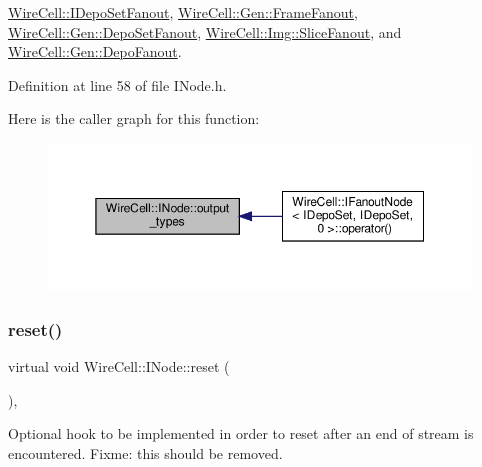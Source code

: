 \hyperlink{class_wire_cell_1_1_i_depo_set_fanout_a90833e933801d4152272189dc6ba1e38}{Wire\+Cell\+::\+I\+Depo\+Set\+Fanout}, \hyperlink{class_wire_cell_1_1_gen_1_1_frame_fanout_a71041fd4bf1a0e030e78a7565f7f1671}{Wire\+Cell\+::\+Gen\+::\+Frame\+Fanout}, \hyperlink{class_wire_cell_1_1_gen_1_1_depo_set_fanout_a11637470dcf8dc0ea0cbf6691a6984c0}{Wire\+Cell\+::\+Gen\+::\+Depo\+Set\+Fanout}, \hyperlink{class_wire_cell_1_1_img_1_1_slice_fanout_a98fe441e7e47306ff0352f547e9b9066}{Wire\+Cell\+::\+Img\+::\+Slice\+Fanout}, and \hyperlink{class_wire_cell_1_1_gen_1_1_depo_fanout_acb986929b5cd38a5ea197985b103102f}{Wire\+Cell\+::\+Gen\+::\+Depo\+Fanout}.



Definition at line 58 of file I\+Node.\+h.

Here is the caller graph for this function\+:
\nopagebreak
\begin{figure}[H]
\begin{center}
\leavevmode
\includegraphics[width=350pt]{class_wire_cell_1_1_i_node_aba7e537684cb4f2453796ff73da2d602_icgraph}
\end{center}
\end{figure}
\mbox{\label{class_wire_cell_1_1_i_node_a7bf4dfff146b72f866ab25f7662c56a0}} 
\subsubsection{\texorpdfstring{reset()}{reset()}}
{\footnotesize\ttfamily virtual void Wire\+Cell\+::\+I\+Node\+::reset (\begin{DoxyParamCaption}{ }\end{DoxyParamCaption})\hspace{0.3cm}{\ttfamily [inline]}, {\ttfamily [virtual]}}

Optional hook to be implemented in order to reset after an end of stream is encountered. Fixme\+: this should be removed. 

